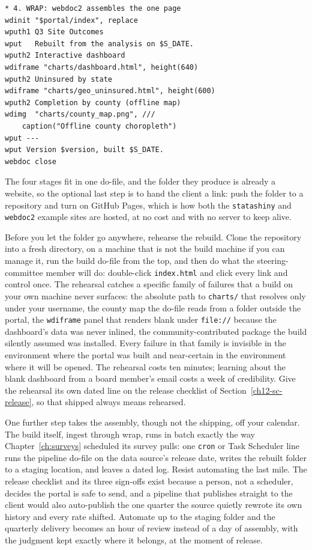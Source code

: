 \par
{\footnotesize
\begin{verbatim}
* 4. WRAP: webdoc2 assembles the one page
wdinit "$portal/index", replace
wputh1 Q3 Site Outcomes
wput   Rebuilt from the analysis on $S_DATE.
wputh2 Interactive dashboard
wdiframe "charts/dashboard.html", height(640)
wputh2 Uninsured by state
wdiframe "charts/geo_uninsured.html", height(600)
wputh2 Completion by county (offline map)
wdimg  "charts/county_map.png", ///
    caption("Offline county choropleth")
wput ---
wput Version $version, built $S_DATE.
webdoc close
\end{verbatim}
}
The four stages fit in one do-file, and the folder they produce is already a website, so the optional last step is to hand the client a link: push the folder to a repository and turn on GitHub Pages, which is how both the \texttt{statashiny} and \texttt{webdoc2} example sites are hosted, at no cost and with no server to keep alive.

Before you let the folder go anywhere, rehearse the rebuild. Clone the repository into a fresh directory, on a machine that is not the build machine if you can manage it, run the build do-file from the top, and then do what the steering-committee member will do: double-click \texttt{index.html} and click every link and control once. The rehearsal catches a specific family of failures that a build on your own machine never surfaces: the absolute path to \texttt{charts/} that resolves only under your username, the county map the do-file reads from a folder outside the portal, the \texttt{wdiframe} panel that renders blank under \texttt{file://} because the dashboard's data was never inlined, the community-contributed package the build silently assumed was installed. Every failure in that family is invisible in the environment where the portal was built and near-certain in the environment where it will be opened. The rehearsal costs ten minutes; learning about the blank dashboard from a board member's email costs a week of credibility. Give the rehearsal its own dated line on the release checklist of Section~\ref{ch12-sc-release}, so that shipped always means rehearsed.

One further step takes the assembly, though not the shipping, off your calendar. The build itself, ingest through wrap, runs in batch exactly the way Chapter~\ref{ch:surveys} scheduled its survey pulls: one \texttt{cron} or Task Scheduler line runs the pipeline do-file on the data source's release date, writes the rebuilt folder to a staging location, and leaves a dated log. Resist automating the last mile. The release checklist and its three sign-offs exist because a person, not a scheduler, decides the portal is safe to send, and a pipeline that publishes straight to the client would also auto-publish the one quarter the source quietly rewrote its own history and every rate shifted. Automate up to the staging folder and the quarterly delivery becomes an hour of review instead of a day of assembly, with the judgment kept exactly where it belongs, at the moment of release.

